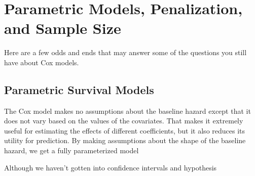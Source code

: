 
\section{Parametric Models, Penalization, and Sample Size}

Here are a few odds and ends that may answer some of the questions you still have about Cox models.

\subsection{Parametric Survival Models}

The Cox model makes no assumptions about the baseline hazard except that it does not vary based on the values of the covariates. That makes it extremely useful for estimating the effects of different coefficients, but it also reduces its utility for prediction. By making assumptions about the shape of the baseline hazard, we get a fully parameterized model 

Although we haven't gotten into confidence intervals and hypothesis 